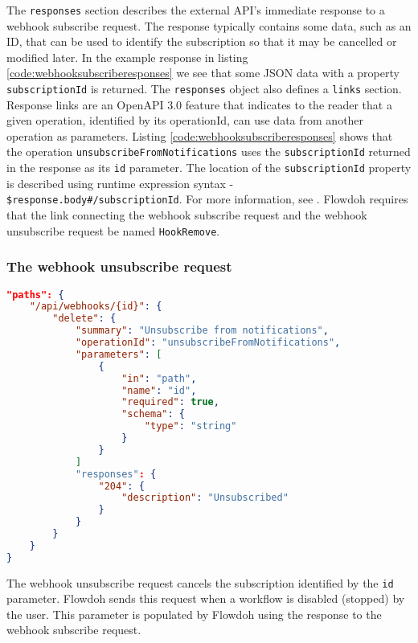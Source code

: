 The \texttt{responses} section describes the external API's immediate response to a webhook subscribe request. The response typically contains some data, such as an ID, that can be used to identify the subscription so that it may be cancelled or modified later. In the example response in listing \ref{code:webhooksubscriberesponses} we see that some JSON data with a property \texttt{subscriptionId} is returned. The \texttt{responses} object also defines a \texttt{links} section. Response links are an OpenAPI 3.0 feature that indicates to the reader that a given operation, identified by its operationId, can use data from another operation as parameters. Listing \ref{code:webhooksubscriberesponses} shows that the operation \texttt{unsubscribeFromNotifications} uses the \texttt{subscriptionId} returned in the response as its \texttt{id} parameter. The location of the \texttt{subscriptionId} property is described using runtime expression syntax - \texttt{\$response.body\#/subscriptionId}. For more information, see . Flowdoh requires that the link connecting the webhook subscribe request and the webhook unsubscribe request be named \texttt{HookRemove}.
\subsubsection{The webhook unsubscribe request}
\begin{lstlisting}[caption={Webhook unsubscribe request},label={code:webhookunsubscribe},language=json]
"paths": {
    "/api/webhooks/{id}": {
        "delete": {
            "summary": "Unsubscribe from notifications",
            "operationId": "unsubscribeFromNotifications",
            "parameters": [
                {
                    "in": "path",
                    "name": "id",
                    "required": true,
                    "schema": {
                        "type": "string"
                    }
                }
            ]
            "responses": {
                "204": {
                    "description": "Unsubscribed"
                }
            }
        }
    }
}
\end{lstlisting}
The webhook unsubscribe request cancels the subscription identified by the \texttt{id} parameter. Flowdoh sends this request when a workflow is disabled (stopped) by the user. This parameter is populated by Flowdoh using the response to the webhook subscribe request.
